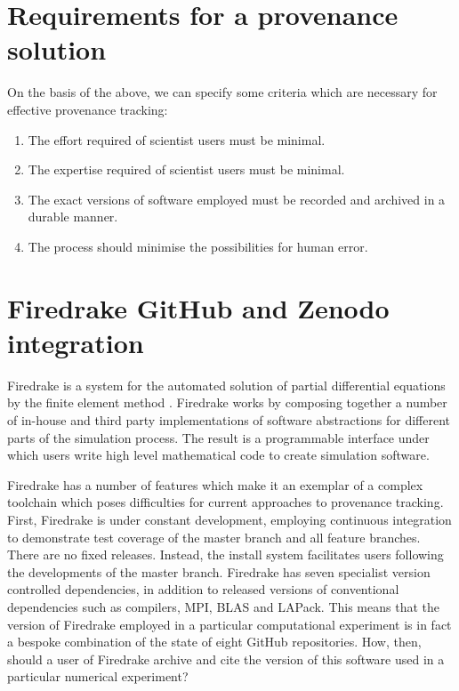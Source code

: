 \documentclass[a4paper,11pt]{article}
\begin{document}
\section{Requirements for a provenance solution}

On the basis of the above, we can specify some criteria which are necessary
for effective provenance tracking:
\begin{enumerate}
\item The effort required of scientist users must be minimal.
\item The expertise required of scientist users must be minimal.
\item The exact versions of software employed must be recorded and archived
  in a durable manner.
\item The process should minimise the possibilities for human error.
\end{enumerate}

\section{Firedrake GitHub and Zenodo integration}

Firedrake is a system for the automated solution of partial differential
equations by the finite element method \parencite{Rathgeber2015}. Firedrake
works by composing together a number of in-house and third party
implementations of software abstractions for different parts of the
simulation process. The result is a programmable interface under which users
write high level mathematical code to create simulation software.

Firedrake has a number of features which make it an exemplar of a complex
toolchain which poses difficulties for current approaches to provenance
tracking. First, Firedrake is under constant development, employing
continuous integration to demonstrate test coverage of the master branch and
all feature branches. There are no fixed releases. Instead, the install system
facilitates users following the developments of the master branch. Firedrake
has seven specialist version controlled dependencies, in addition to released
versions of conventional dependencies such as compilers, MPI, BLAS and
LAPack. This means that the version of Firedrake employed in a particular
computational experiment is in fact a bespoke combination of the state of
eight GitHub repositories. How, then, should a user of Firedrake archive and
cite the version of this software used in a particular numerical experiment?
\end{document}
